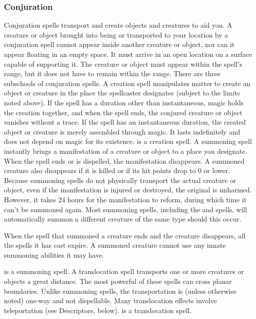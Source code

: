 \subsubsection{Conjuration}
Conjuration spells transport and create objects and creatures to aid you. A creature or object brought into being or transported to your location by a conjuration spell cannot appear inside another creature or object, nor can it appear floating in an empty space. It must arrive in an open location on a surface capable of supporting it. The creature or object must appear within the spell's range, but it does not have to remain within the range. There are three subschools of conjuration spells.
 A creation spell manipulates matter to create an object or creature in the place the spellcaster designates (subject to the limits noted above). If the spell has a duration other than instantaneous, magic holds the creation together, and when the spell ends, the conjured creature or object vanishes without a trace. If the spell has an instantaneous duration, the created object or creature is merely assembled through magic. It lasts indefinitely and does not depend on magic for its existence.  is a creation spell.
 A summoning spell instantly brings a manifestation of a creature or object to a place you designate. When the spell ends or is dispelled, the manifestation disappears. A summoned creature also disappears if it is killed or if its hit points drop to 0 or lower. Because summoning spells do not physically transport the actual creature or object, even if the manifestation is injured or destroyed, the original is unharmed. However, it takes 24 hours for the manifestation to reform, during which time it can't be summoned again. Most summoning spells, including the  and  spells, will automatically summon a different creature of the same type should this occur.
\par When the spell that summoned a creature ends and the creature disappears, all the spells it has cast expire. A summoned creature cannot use any innate summoning abilities it may have.
\par {} is a summoning spell.
 A translocation spell transports one or more creatures or objects a great distance. The most powerful of these spells can cross planar boundaries. Unlike summoning spells, the transportation is (unless otherwise noted) one-way and not dispellable. Many translocation effects involve teleportation (see Descriptors, below).  is a translocation spell.

